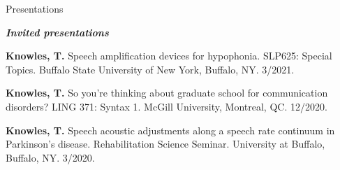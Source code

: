 \documentclass{resume} %
\begin{document}

\begin{rSection}{Presentations}

\begin{center}
	{\bf \emph{Invited presentations}}
\end{center}

\begin{etaremune}

\item {\bf Knowles, T.} Speech amplification devices for hypophonia. SLP625: Special Topics. Buffalo State University of New York, Buffalo, NY. 3/2021.

\item {\bf Knowles, T.} So you're thinking about graduate school for communication disorders? LING 371: Syntax 1. McGill University, Montreal, QC. 12/2020.

\item {\bf Knowles, T.} Speech acoustic adjustments along a speech rate continuum in Parkinson's disease. Rehabilitation Science Seminar. University at Buffalo, Buffalo, NY. 3/2020.

%
%
%


\end{etaremune}
\end{rSection}
\end{document}
